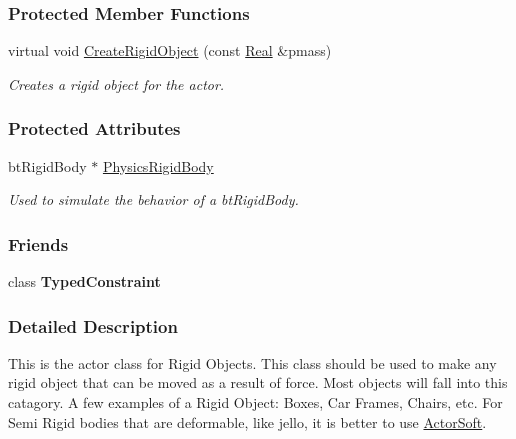 \subsubsection*{Protected Member Functions}
\begin{DoxyCompactItemize}
\item 
virtual void \hyperlink{classMezzanine_1_1ActorRigid_a44a1c393e69456fb7fa79affe1684153}{CreateRigidObject} (const \hyperlink{namespaceMezzanine_a726731b1a7df72bf3583e4a97282c6f6}{Real} \&pmass)
\begin{DoxyCompactList}\small\item\em Creates a rigid object for the actor. \item\end{DoxyCompactList}\end{DoxyCompactItemize}
\subsubsection*{Protected Attributes}
\begin{DoxyCompactItemize}
\item 
\hypertarget{classMezzanine_1_1ActorRigid_a92b4e040b752527b73e861ab7c00119e}{
btRigidBody $\ast$ \hyperlink{classMezzanine_1_1ActorRigid_a92b4e040b752527b73e861ab7c00119e}{PhysicsRigidBody}}
\label{classMezzanine_1_1ActorRigid_a92b4e040b752527b73e861ab7c00119e}

\begin{DoxyCompactList}\small\item\em Used to simulate the behavior of a btRigidBody. \item\end{DoxyCompactList}\end{DoxyCompactItemize}
\subsubsection*{Friends}
\begin{DoxyCompactItemize}
\item 
\hypertarget{classMezzanine_1_1ActorRigid_aefa96202ca25d6b82320520f2789b6cf}{
class {\bfseries TypedConstraint}}
\label{classMezzanine_1_1ActorRigid_aefa96202ca25d6b82320520f2789b6cf}

\end{DoxyCompactItemize}


\subsubsection{Detailed Description}
This is the actor class for Rigid Objects. This class should be used to make any rigid object that can be moved as a result of force. Most objects will fall into this catagory. A few examples of a Rigid Object: Boxes, Car Frames, Chairs, etc. For Semi Rigid bodies that are deformable, like jello, it is better to use \hyperlink{classMezzanine_1_1ActorSoft}{ActorSoft}. 

